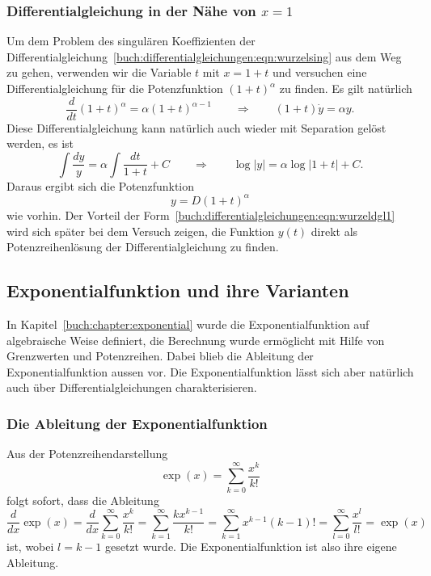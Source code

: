 %
%
\subsubsection{Differentialgleichung in der Nähe von $x=1$}
Um dem Problem des singulären Koeffizienten der
Differentialgleichung~\eqref{buch:differentialgleichungen:eqn:wurzelsing}
aus dem Weg zu gehen, verwenden wir die Variable $t$ mit $x=1+t$ und
versuchen eine Differentialgleichung für die Potenzfunktion
$(1+t)^\alpha$ zu finden.
Es gilt natürlich
\begin{equation}
\frac{d}{dt} (1+t)^\alpha
=
\alpha (1+t)^{\alpha-1}
\qquad\Rightarrow\qquad
(1+t) \dot{y} = \alpha y.
\label{buch:differentialgleichungen:eqn:wurzeldgl1}
\end{equation}
Diese Differentialgleichung kann natürlich auch wieder mit Separation
gelöst werden, es ist
\begin{equation}
\int
\frac{dy}{y} 
=
\alpha
\int
\frac{dt}{1+t}
+
C
\qquad\Rightarrow\qquad
\log|y| = \alpha \log|1+t| + C.
\label{buch:differentialgleichungen:eqn:wurzeldgl1loesung}
\end{equation}
Daraus ergibt sich die Potenzfunktion
\[
y=D(1+t)^\alpha
\]
wie vorhin.
Der Vorteil der
Form~\eqref{buch:differentialgleichungen:eqn:wurzeldgl1}
wird sich später bei dem Versuch zeigen, die Funktion $y(t)$
direkt als Potenzreihenlösung der Differentialgleichung zu finden.

%
%
\subsection{Exponentialfunktion und ihre Varianten
\label{buch:differentialgleichungen:subsection:exponentialfunktion}}
%
In Kapitel~\ref{buch:chapter:exponential} wurde die Exponentialfunktion
auf algebraische Weise definiert, die Berechnung wurde ermöglicht
mit Hilfe von Grenzwerten und Potenzreihen.
Dabei blieb die Ableitung der Exponentialfunktion aussen vor.
Die Exponentialfunktion lässt sich aber natürlich auch über
Differentialgleichungen charakterisieren.

%
%
\subsubsection{Die Ableitung der Exponentialfunktion}
%
Aus der Potenzreihendarstellung
\[
\exp(x)
=
\sum_{k=0}^\infty \frac{x^k}{k!}
\]
folgt sofort, dass die Ableitung
\[
\frac{d}{dx}\exp(x)
=
\frac{d}{dx}
\sum_{k=0}^\infty
\frac{x^k}{k!}
=
\sum_{k=1}^\infty \frac{kx^{k-1}}{k!}
=
\sum_{k=1}^\infty{x^{k-1}}{(k-1)!}
=
\sum_{l=0}^\infty \frac{x^l}{l!}
=
\exp(x)
\]
ist,
wobei $l=k-1$ gesetzt wurde.
Die Exponentialfunktion ist also ihre eigene Ableitung.

